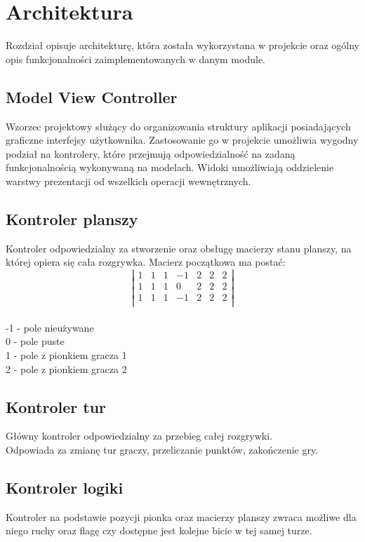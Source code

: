 \newpage\section{Architektura}
Rozdział opisuje architekturę, która została wykorzystana w projekcie oraz ogólny opis funkcjonalności zaimplementowanych w danym module.

\subsection{Model View Controller}
Wzorzec projektowy służący do organizowania struktury aplikacji posiadających graficzne interfejsy użytkownika. Zastosowanie go w projekcie umożliwia wygodny podział na kontrolery, które przejmują odpowiedzialność na zadaną funkcjonalnością wykonywaną na modelach. Widoki umożliwiają oddzielenie warstwy prezentacji od wszelkich operacji wewnętrznych.

\subsection{Kontroler planszy}
Kontroler odpowiedzialny za stworzenie oraz obsługę macierzy stanu planszy, na której opiera się cała rozgrywka.  Macierz początkowa ma postać:
$$
\left| \begin{array}{ccccccc}
1 & 1 & 1 & -1 & 2 & 2 & 2 \\
1 & 1 & 1 & 0 & 2 & 2 & 2  \\
1 & 1 & 1 & -1 & 2 & 2 & 2 \\
\end{array} \right|
$$\\
-1 - pole nieużywane \\
0 - pole puste \\
1 - pole z pionkiem gracza 1 \\
2 - pole z pionkiem gracza 2

\subsection{Kontroler tur}
Główny kontroler odpowiedzialny za przebieg całej rozgrywki.\\
Odpowiada za zmianę tur graczy, przeliczanie punktów, zakończenie gry. 

\subsection{Kontroler logiki}
Kontroler na podstawie pozycji pionka oraz macierzy planszy zwraca możliwe dla niego ruchy oraz flagę czy dostępne jest kolejne bicie w tej samej turze. 

